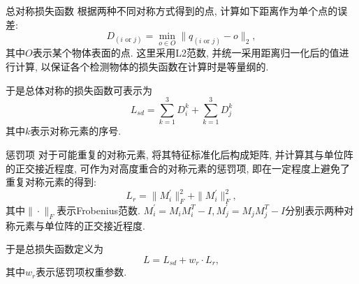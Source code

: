 \documentclass[UTF8, aspectratio=169, 11pt]{ctexbeamer}
\begin{document}
    \begin{frame}{总对称损失函数}
        根据两种不同对称方式得到的点, 计算如下距离作为单个点的误差:
        \begin{equation}
            D_{(i \text{ or } j)}=\min_{o\in O} \|q_{(i \text{ or } j)}-o\|_2,
        \end{equation}
        其中$O$表示某个物体表面的点. 这里采用L2范数, 并统一采用距离归一化后的值进行计算, 以保证各个检测物体的损失函数在计算时是等量纲的.

        于是总体对称的损失函数可表示为
        \begin{equation}
            L_{sd} = \sum_{k=1}^{3} D_{i}^{k} +\sum_{k=1}^{3} D_{j}^{k}
        \end{equation}
        其中$k$表示对称元素的序号.
    \end{frame}

    \begin{frame}{惩罚项}
        对于可能重复的对称元素, 将其特征标准化后构成矩阵, 并计算其与单位阵的正交接近程度, 可作为对高度重合的对称元素的惩罚项, 即在一定程度上避免了重复对称元素的得到:
        \begin{equation}
            L_r = \|M^{\prime}_i\|_F^2+\|M^{\prime}_i\|_F^2,
        \end{equation}
        其中$\|\cdot \|_F$表示Frobenius范数. $M^{\prime}_i=M_iM_i^T-I, M^{\prime}_j=M_jM_j^T-I$分别表示两种对称元素与单位阵的正交接近程度.

        于是总损失函数定义为
        \begin{equation}
            L=L_{sd}+w_r\cdot L_r,
        \end{equation}
        其中$w_r$表示惩罚项权重参数.
    \end{frame}
\end{document}
